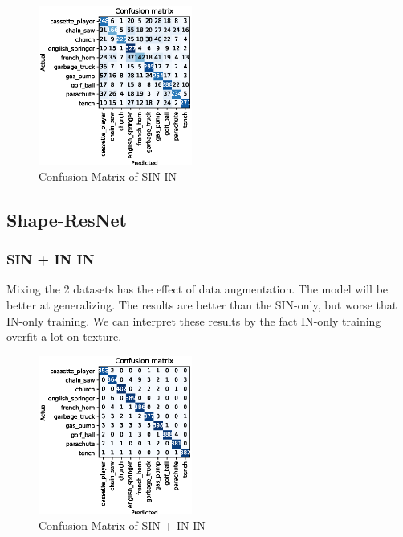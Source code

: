 \documentclass{article}
\begin{document}
\begin{figure}[h!]
  \includegraphics[width = 0.45\textwidth]{imgs/sin/sin-in/sin-in_confusion_matrix_0.624.eps}
  \caption{Confusion Matrix of SIN \texorpdfstring{\textrightarrow} .IN}
  \label{cm_sin-in}
\end{figure}

\subsection{Shape-ResNet}

\subsubsection{SIN + IN \texorpdfstring{\textrightarrow} .IN}

Mixing the 2 datasets has the effect of data augmentation. The model will be better
at generalizing. The results are better than the SIN-only, but worse that IN-only training.
We can interpret these results by the fact IN-only training overfit a lot on texture.

\begin{figure}[h!]
  \includegraphics[width = 0.45\textwidth]{imgs/sinin/sinin-in_confusion_matrix_0.973.eps}
  \caption{Confusion Matrix of SIN + IN \texorpdfstring{\textrightarrow} .IN}
  \label{cm_sinin-in}
\end{figure}
\end{document}
